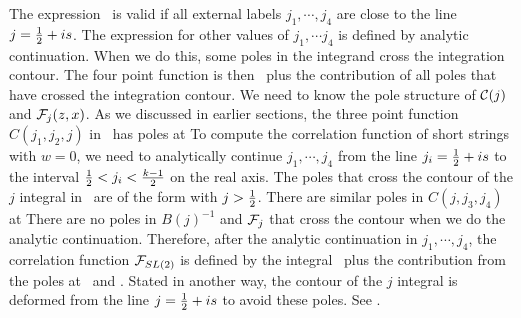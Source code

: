 The expression \expres\ is valid
if all external labels $j_1, \cdots, j_4$
are close to the line $j = {1\over 2} + is$.
The expression for other values
of $j_1, \cdots j_4$ is defined by  analytic continuation.
When we do this, some poles in the integrand
 cross the integration contour.
The four point function is then
\expres\ plus the contribution of all poles
that have crossed the integration contour.
We need to know the pole structure of ${\cal C}(j)$ and
${\cal F}_j(z,x)$.
As we discussed in  earlier sections,
the  three point function $C(j_1,j_2,j)$  in
\whatc\ has poles at
\eqn{}
To compute the correlation function of short strings
with $w=0$, we need to analytically
continue $j_1, \cdots, j_4$
from the line $j_i= {1\over 2} + is$ to the interval
${1\over 2} < j_i < {k-1 \over 2}$ on the real axis.
The poles that cross
the contour of the $j$ integral in \expres\ are of the form
\eqn{}
with $j>{1\over 2}$.
There are similar poles in $C(j,j_3,j_4)$ at
\eqn{}
There are no poles in $B(j)^{-1}$
and ${\cal F}_j$ that cross the contour when we do
the analytic continuation. Therefore, after the analytic
continuation in $j_1, \cdots, j_4$, the correlation
function ${\cal F}_{SL(2)}$ is defined by the integral
\expres\ plus the contribution from the poles at \polecrossing\
and \polecrossingtwo . Stated in another way,
the contour of the $j$ integral is deformed from the line
$j={1\over 2} + is$ to avoid these poles. See \polestwo .

\ifig{}


